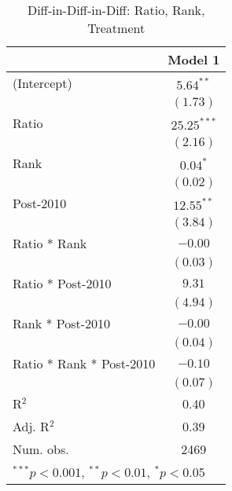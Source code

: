 \clearpage
\begin{table}
\begin{center}
\begin{tabular}{l c }
\hline
                         & Model 1 \\
\hline
(Intercept)              & $5.64^{**}$   \\
                         & $(1.73)$      \\
Ratio                    & $25.25^{***}$ \\
                         & $(2.16)$      \\
Rank                     & $0.04^{*}$    \\
                         & $(0.02)$      \\
Post-2010                & $12.55^{**}$  \\
                         & $(3.84)$      \\
Ratio * Rank             & $-0.00$       \\
                         & $(0.03)$      \\
Ratio * Post-2010        & $9.31$        \\
                         & $(4.94)$      \\
Rank * Post-2010         & $-0.00$       \\
                         & $(0.04)$      \\
Ratio * Rank * Post-2010 & $-0.10$       \\
                         & $(0.07)$      \\
\hline
R$^2$                    & 0.40          \\
Adj. R$^2$               & 0.39          \\
Num. obs.                & 2469          \\
\hline
\multicolumn{2}{l}{\scriptsize{$^{***}p<0.001$, $^{**}p<0.01$, $^*p<0.05$}}
\end{tabular}
\caption{Diff-in-Diff-in-Diff: Ratio, Rank, Treatment}
\label{tab:3d}
\end{center}
\end{table}
\clearpage